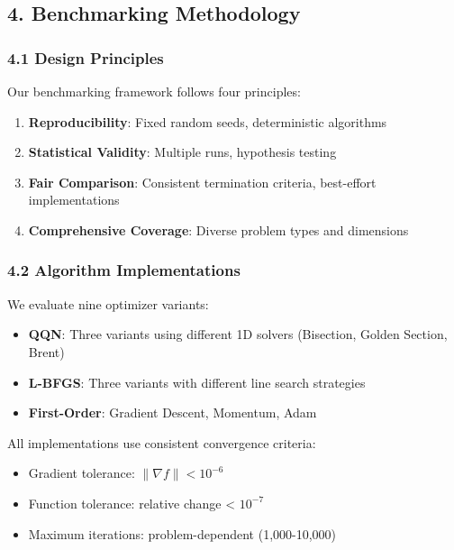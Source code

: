 \hypertarget{benchmarking-methodology}{%
\subsection{4. Benchmarking Methodology}\label{benchmarking-methodology}}

\hypertarget{design-principles}{%
\subsubsection{4.1 Design Principles}\label{design-principles}}

Our benchmarking framework follows four principles:

\begin{enumerate}
\def\labelenumi{\arabic{enumi}.}
\tightlist
\item
  \textbf{Reproducibility}: Fixed random seeds, deterministic algorithms
\item
  \textbf{Statistical Validity}: Multiple runs, hypothesis testing
\item
  \textbf{Fair Comparison}: Consistent termination criteria, best-effort implementations
\item
  \textbf{Comprehensive Coverage}: Diverse problem types and dimensions
\end{enumerate}

\hypertarget{algorithm-implementations}{%
\subsubsection{4.2 Algorithm Implementations}\label{algorithm-implementations}}

We evaluate nine optimizer variants:

\begin{itemize}
\tightlist
\item
  \textbf{QQN}: Three variants using different 1D solvers (Bisection, Golden Section, Brent)
\item
  \textbf{L-BFGS}: Three variants with different line search strategies
\item
  \textbf{First-Order}: Gradient Descent, Momentum, Adam
\end{itemize}

All implementations use consistent convergence criteria:

\begin{itemize}
\tightlist
\item
  Gradient tolerance: \(\|\nabla f\| < 10^{-6}\)
\item
  Function tolerance: relative change \textless{} \(10^{-7}\)
\item
  Maximum iterations: problem-dependent (1,000-10,000)
\end{itemize}

